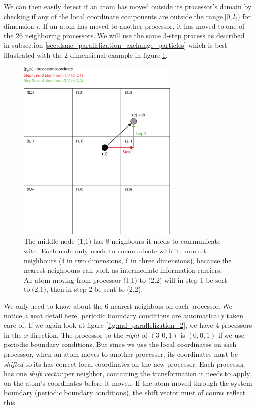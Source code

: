 We can then easily detect if an atom has moved outside its processor's domain by checking if any of the local coordinate components are outside the range $[0, l_i)$ for dimension $i$. If an atom has moved to another processor, it has moved to one of the 26 neighboring processors. We will use the same 3-step process as described in subsection \ref{sec:dsmc_parallelization_exchange_particles} which is best illustrated with the 2-dimensional example in figure \ref{fig:md_parallelization_facet_technique}.
\begin{figure}[h!]
\begin{center}
\includegraphics[width=0.7\textwidth, trim=0cm 0cm 0cm 0cm, clip]{MD/figures/parallelization_facet_technique.eps}
\end{center}
\caption{The middle node (1,1) has 8 neighbours it needs to communicate with. Each node only needs to communicate with its nearest neighbours (4 in two dimensions, 6 in three dimensions), because the nearest neighbours can work as intermediate information carriers. An atom moving from processor (1,1) to (2,2) will in step 1 be sent to (2,1), then in step 2 be sent to (2,2).}
\label{fig:md_parallelization_facet_technique}
\end{figure}
We only need to know about the 6 nearest neighbors on each processor. We notice a neat detail here, periodic boundary conditions are automatically taken care of. If we again look at figure \ref{fig:md_parallelization_2}, we have 4 processors in the $x$-direction. The processor to the \textit{right} of $(3,0,1)$ is $(0,0,1)$ if we use periodic boundary conditions. But since we use the local coordinates on each processor, when an atom moves to another processor, its coordinates must be \textit{shifted} so its has correct local coordinates on the new processor. Each processor has one \textit{shift vector} per neighbor, containing the transformation it needs to apply on the atom's coordinates before it moved. If the atom moved through the system boundary (periodic boundary conditions), the shift vector must of course reflect this. 
